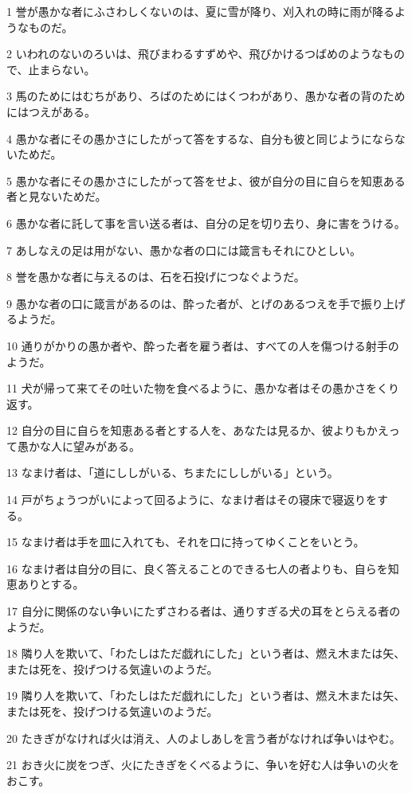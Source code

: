 \par 1 誉が愚かな者にふさわしくないのは、夏に雪が降り、刈入れの時に雨が降るようなものだ。
\par 2 いわれのないのろいは、飛びまわるすずめや、飛びかけるつばめのようなもので、止まらない。
\par 3 馬のためにはむちがあり、ろばのためにはくつわがあり、愚かな者の背のためにはつえがある。
\par 4 愚かな者にその愚かさにしたがって答をするな、自分も彼と同じようにならないためだ。
\par 5 愚かな者にその愚かさにしたがって答をせよ、彼が自分の目に自らを知恵ある者と見ないためだ。
\par 6 愚かな者に託して事を言い送る者は、自分の足を切り去り、身に害をうける。
\par 7 あしなえの足は用がない、愚かな者の口には箴言もそれにひとしい。
\par 8 誉を愚かな者に与えるのは、石を石投げにつなぐようだ。
\par 9 愚かな者の口に箴言があるのは、酔った者が、とげのあるつえを手で振り上げるようだ。
\par 10 通りがかりの愚か者や、酔った者を雇う者は、すべての人を傷つける射手のようだ。
\par 11 犬が帰って来てその吐いた物を食べるように、愚かな者はその愚かさをくり返す。
\par 12 自分の目に自らを知恵ある者とする人を、あなたは見るか、彼よりもかえって愚かな人に望みがある。
\par 13 なまけ者は、「道にししがいる、ちまたにししがいる」という。
\par 14 戸がちょうつがいによって回るように、なまけ者はその寝床で寝返りをする。
\par 15 なまけ者は手を皿に入れても、それを口に持ってゆくことをいとう。
\par 16 なまけ者は自分の目に、良く答えることのできる七人の者よりも、自らを知恵ありとする。
\par 17 自分に関係のない争いにたずさわる者は、通りすぎる犬の耳をとらえる者のようだ。
\par 18 隣り人を欺いて、「わたしはただ戯れにした」という者は、燃え木または矢、または死を、投げつける気違いのようだ。
\par 19 隣り人を欺いて、「わたしはただ戯れにした」という者は、燃え木または矢、または死を、投げつける気違いのようだ。
\par 20 たきぎがなければ火は消え、人のよしあしを言う者がなければ争いはやむ。
\par 21 おき火に炭をつぎ、火にたきぎをくべるように、争いを好む人は争いの火をおこす。
